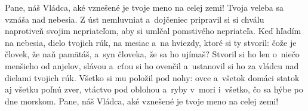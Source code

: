 Pane, náš Vládca,
aké vznešené je tvoje meno na celej zemi!
\versseparator
Tvoja veleba sa vznáša nad nebesia.
\versseparator
Z úst nemluvniat a~dojčeniec pripravil si si chválu
naprotiveň svojim nepriateľom,
aby si umlčal pomstivého nepriateľa.
\versseparator
Keď hľadím na nebesia, dielo tvojich rúk,
na mesiac a~na hviezdy, ktoré si ty stvoril:
\versseparator
čože je človek, že naň pamätáš,
a~syn človeka, že sa ho ujímaš?
\versseparator
Stvoril si ho len o~niečo menšieho od anjelov,
slávou a~cťou si ho ovenčil
a~ustanovil si ho za vládcu nad dielami tvojich rúk.
\versseparator
Všetko si mu položil pod nohy:
ovce a~všetok domáci statok
aj všetku poľnú zver,
\versseparator
vtáctvo pod oblohou a~ryby v~mori
 i~všetko, čo sa hýbe po dne morskom.
\versseparator
Pane, náš Vládca,
aké vznešené je tvoje meno na celej zemi!
